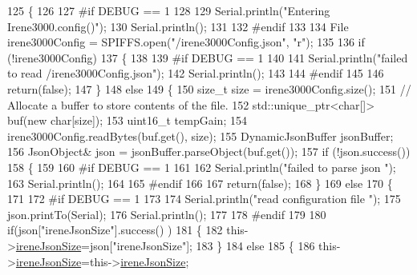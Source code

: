 \begin{DoxyCode}
125 \{
126 
127 \textcolor{preprocessor}{#if DEBUG == 1 }
128 
129     Serial.println(\textcolor{stringliteral}{"Entering Irene3000.config()"});
130     Serial.println();
131 
132 \textcolor{preprocessor}{#endif}
133 
134     File irene3000Config = SPIFFS.open(\textcolor{stringliteral}{"/irene3000Config.json"}, \textcolor{stringliteral}{"r"});
135 
136     \textcolor{keywordflow}{if} (!irene3000Config) 
137     \{
138     
139 \textcolor{preprocessor}{    #if DEBUG == 1 }
140 
141         Serial.println(\textcolor{stringliteral}{"failed to read /irene3000Config.json"});
142         Serial.println();
143     
144 \textcolor{preprocessor}{    #endif}
145 
146         \textcolor{keywordflow}{return}(\textcolor{keyword}{false});
147     \}
148     \textcolor{keywordflow}{else}
149     \{
150         \textcolor{keywordtype}{size\_t} size = irene3000Config.size();
151         \textcolor{comment}{// Allocate a buffer to store contents of the file.}
152         std::unique\_ptr<char[]> buf(\textcolor{keyword}{new} \textcolor{keywordtype}{char}[size]);
153             uint16\_t tempGain;
154         irene3000Config.readBytes(buf.get(), size);
155         DynamicJsonBuffer jsonBuffer;
156         JsonObject& json = jsonBuffer.parseObject(buf.get());
157         \textcolor{keywordflow}{if} (!json.success()) 
158         \{
159         
160 \textcolor{preprocessor}{        #if DEBUG == 1 }
161 
162             Serial.println(\textcolor{stringliteral}{"failed to parse json "});
163             Serial.println();
164         
165 \textcolor{preprocessor}{        #endif}
166             
167             \textcolor{keywordflow}{return}(\textcolor{keyword}{false});
168         \} 
169         \textcolor{keywordflow}{else}
170         \{
171         
172 \textcolor{preprocessor}{        #if DEBUG == 1 }
173     
174             Serial.println(\textcolor{stringliteral}{"read configuration file "});
175             json.printTo(Serial);
176             Serial.println();
177         
178 \textcolor{preprocessor}{        #endif }
179             
180             \textcolor{keywordflow}{if}(json[\textcolor{stringliteral}{"ireneJsonSize"}].success() )
181             \{
182                 this->\hyperlink{classIrene3000_a6534710e4c81669dcc828d2c5450fabe}{ireneJsonSize}=json[\textcolor{stringliteral}{"ireneJsonSize"}];
183             \}
184             \textcolor{keywordflow}{else}
185             \{
186                 this->\hyperlink{classIrene3000_a6534710e4c81669dcc828d2c5450fabe}{ireneJsonSize}=this->\hyperlink{classIrene3000_a6534710e4c81669dcc828d2c5450fabe}{ireneJsonSize};

\end{DoxyCode}
